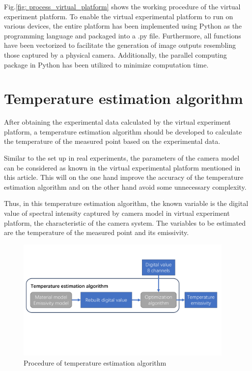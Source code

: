 Fig.\ref{fig: process_virtual_platform} shows the working procedure of the 
virtual experiment platform. 
To enable the virtual experimental platform to run on various devices, 
the entire platform has been implemented using Python as the 
programming language and packaged into a .py file. Furthermore, all 
functions have been vectorized to facilitate the generation of image 
outputs resembling those captured by a physical camera. Additionally, 
the parallel computing package in Python has been utilized to minimize 
computation time.


\section{Temperature estimation algorithm}
After obtaining the experimental data calculated by the virtual experiment platform, 
a temperature estimation algorithm should be developed to calculate the temperature 
of the measured point based on the experimental data.


Similar to the set up in real experiments, the parameters of the camera model can be 
considered as known in the virtual experimental platform mentioned in this article. 
This will on the one hand improve the accuracy of the temperature estimation algorithm
and on the other hand avoid some unnecessary complexity.


Thus, in this temperature estimation algorithm, the known variable is the digital value of 
spectral intensity captured by camera model in virtual experiment platform, the characteristic 
of the camera system. The variables to be estimated are the temperature of the measured point and 
its emissivity.


\begin{figure}[htbp]
    \centering
    \includegraphics[width=0.95\textwidth]{figures/temperature_esti_algorithm.pdf}
    \caption{Procedure of temperature estimation algorithm}
    \label{fig: temperature_estimation_algorithm}
\end{figure}


